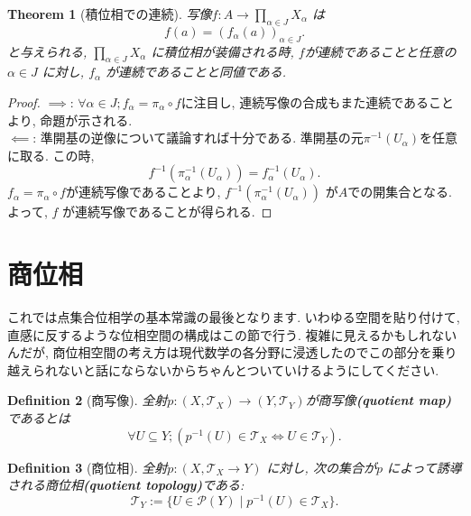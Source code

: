 \documentclass[dvipdfmx]{jbook}
\newtheorem{theorem}{Theorem}[section]
\newtheorem{definition}[theorem]{Definition}
\theoremstyle{remark}
\theoremstyle{plain}
\begin{document}
\begin{theorem}[積位相での連続]
	写像$f: A\to  \prod_{\alpha \in J} X_{\alpha}  $ は
	\[
	f(a) = (f_{\alpha}(a))_{\alpha \in J}
	.\] 
	と与えられる, $\prod_{\alpha \in J} X_{\alpha}  $ に積位相が装備される時, $f$が連続であることと任意の $\alpha \in J$ に対し, $f_{\alpha}$ が連続であることと同値である.
\end{theorem}

\begin{proof}
	$\implies$: $\forall \alpha \in J; f_{\alpha} = \pi_{\alpha} \circ f$に注目し, 連続写像の合成もまた連続であることより, 命題が示される.\\
	 $\impliedby$: 準開基の逆像について議論すれば十分である. 準開基の元$\pi^{-1}\left( U_{\alpha}\right) $を任意に取る. この時, 
	  \[
	 f^{-1}\left(\pi_{\alpha} ^{-1} \left( U_{\alpha}  \right) \right) = f_{\alpha}^{-1}\left( U_{\alpha} \right) 
	 .\] 
	 $f_{\alpha} = \pi_{\alpha} \circ f$が連続写像であることより, 
	 $f^{-1} \left( \pi_{\alpha} ^{-1}\left( U_{\alpha} \right)  \right) $ が$A$での開集合となる. 
	 よって,  $f$ が連続写像であることが得られる. 
\end{proof}

\section{商位相}

これでは点集合位相学の基本常識の最後となります.
いわゆる空間を貼り付けて, 直感に反するような位相空間の構成はこの節で行う.
複雑に見えるかもしれないんだが, 商位相空間の考え方は現代数学の各分野に浸透したのでこの部分を乗り越えられないと話にならないからちゃんとついていけるようにしてください. 

\begin{definition}[商写像]
	全射$p: \left( X, \mathcal{T}_X \right) \to \left( Y, \mathcal{T}_Y \right)  $が商写像\textbf{(quotient map)}であるとは
	\[
	\forall U \subseteq Y;\left( p^{-1}\left( U \right) \in \mathcal{T}_X \iff U \in \mathcal{T}_Y \right) 
	.\] 
\end{definition}

\begin{definition}[商位相]
	全射$p:\left( X,\mathcal{T}_X \to Y \right) $ に対し, 次の集合が$p$ によって誘導される商位相\textbf{(quotient topology)}である:
	\[
	\mathcal{T}_Y := \{U \in \mathcal{P}\left( Y \right)  \mid p^{-1}\left( U \right)  \in \mathcal{T}_X \} 
	.\] 
	
\end{definition}
\end{document}
